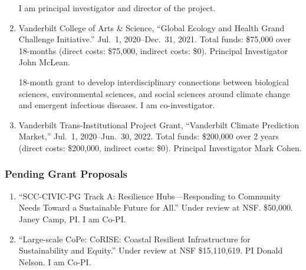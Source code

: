 \begin{enumerate}
\begin{credit}
I am principal investigator and director of the project.
\end{credit}
%
%
\item Vanderbilt College of Arts \& Science,
``Global Ecology and Health Grand Challenge Initiative.''
Jul.~1, 2020--Dec.~31, 2021.
Total funds: \$75,000 over 18-months (direct costs: \$75,000, indirect costs: \$0).
Principal Investigator John McLean.
\begin{credit}
18-month grant to develop interdisciplinary connections between biological sciences, environmental sciences, and social sciences around climate change and emergent infectious diseases.
I am co-investigator.
\end{credit}
%
%
\item Vanderbilt Trans-Institutional Project Grant,
``Vanderbilt Climate Prediction Market,''
Jul.~1, 2020--Jun.~30, 2022.
Total funds: \$200,000 over 2 years (direct costs: \$200,000, indirect costs: \$0).
Principal Investigator Mark Cohen.
\end{enumerate}
%
\iftrue
\subsubsection{Pending Grant Proposals}
\begin{enumerate}
 \item ``SCC-CIVIC-PG Track A: Resilience Hubs---Responding to Community Needs
   Toward a Sustainable Future for All.''
   Under review at NSF. \$50,000. Janey Camp, PI. I am Co-PI.
 \item ``Large-scale CoPe: CoRISE: Coastal Resilient Infrastructure for Sustainability and Equity.''
 Under review at NSF
 \$15,110,619.
 PI Donald Nelson. I am Co-PI.
\end{enumerate}
\fi
%
